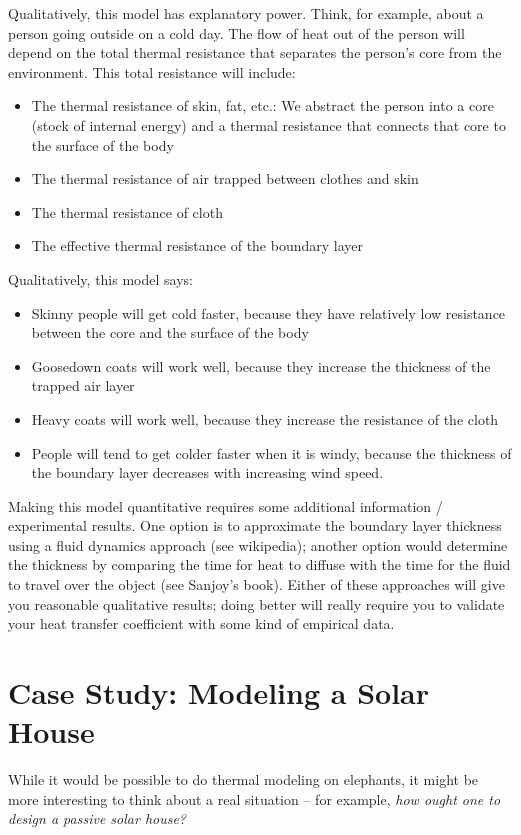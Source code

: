 \documentclass[10pt]{book}
\begin{document}
Qualitatively, this model has explanatory power.  Think, for example, about a person going outside on a cold day.  The flow of heat out of the person will depend on the total thermal resistance that separates the person's core from the environment.  This total resistance will include:
\begin{itemize}
\item The thermal resistance of skin, fat, etc.: We abstract the person into a core (stock of internal energy) and a thermal resistance that connects that core to the surface of the body
\item The thermal resistance of air trapped between clothes and skin
\item The thermal resistance of cloth
\item The effective thermal resistance of the boundary layer
\end{itemize}
Qualitatively, this model says:
\begin{itemize}
\item Skinny people will get cold faster, because they have relatively low resistance between the core and the surface of the body
\item Goosedown coats will work well, because they increase the thickness of the trapped air layer
\item Heavy coats will work well, because they increase the resistance of the cloth
\item People will tend to get colder faster when it is windy, because the thickness of the boundary layer decreases with increasing wind speed.
\end{itemize}
Making this model quantitative requires some additional information / experimental results.  One option is to approximate the boundary layer thickness using a fluid dynamics approach (see wikipedia); another option would determine the thickness by comparing the time for heat to diffuse with the time for the fluid to travel over the object (see Sanjoy's book).  Either of these approaches will give you reasonable qualitative results; doing better will really require you to validate your heat transfer coefficient with some kind of empirical data.

\section{Case Study: Modeling a Solar House}

While it would be possible to do thermal modeling on elephants, it might be more interesting to think about a real situation -- for example, {\it how ought one to design a passive solar house?} 
\end{document}
